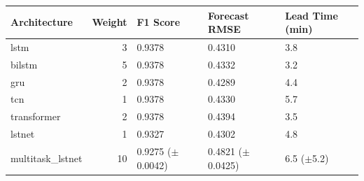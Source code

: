 \begin{tabular}{lrlll}
\toprule
Architecture & Weight & F1 Score & Forecast RMSE & Lead Time (min) \\
\midrule
lstm & 3 & 0.9378 & 0.4310 & 3.8 \\
bilstm & 5 & 0.9378 & 0.4332 & 3.2 \\
gru & 2 & 0.9378 & 0.4289 & 4.4 \\
tcn & 1 & 0.9378 & 0.4330 & 5.7 \\
transformer & 2 & 0.9378 & 0.4394 & 3.5 \\
lstnet & 1 & 0.9327 & 0.4302 & 4.8 \\
multitask_lstnet & 10 & 0.9275 ($\pm$0.0042) & 0.4821 ($\pm$0.0425) & 6.5 ($\pm$5.2) \\
\bottomrule
\end{tabular}
